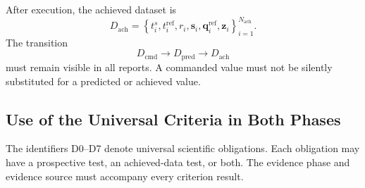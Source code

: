 \documentclass[11pt,a4paper]{article}
\begin{document}
After execution, the achieved dataset is
\begin{equation}
    D_{\mathrm{ach}}
    =
    \left\{
        t_i^s,
        t_i^{\mathrm{ref}},
        r_i,
        \mathbf{s}_i,
        \mathbf{q}^{\mathrm{ref}}_i,
        \mathbf{z}_i
    \right\}_{i=1}^{N_{\mathrm{ach}}}.
\end{equation}
The transition
\begin{equation}
    D_{\mathrm{cmd}}
    \longrightarrow
    D_{\mathrm{pred}}
    \longrightarrow
    D_{\mathrm{ach}}
\end{equation}
must remain visible in all reports. A commanded value must not be silently
substituted for a predicted or achieved value.

\subsection{Use of the Universal Criteria in Both Phases}

The identifiers D0--D7 denote universal scientific obligations. Each
obligation may have a prospective test, an achieved-data test, or both. The
evidence phase and evidence source must accompany every criterion result.
\end{document}

